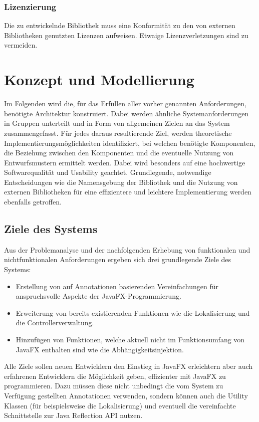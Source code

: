 \subsubsection{\nreq{} Lizenzierung}
Die zu entwickelnde Bibliothek muss eine Konformität zu den von externen Bibliotheken genutzten Lizenzen aufweisen. Etwaige Lizenzverletzungen sind zu vermeiden.

\section{Konzept und Modellierung}
\label{konzept_und_modellierung}
Im Folgenden wird die, für das Erfüllen aller vorher genannten Anforderungen, benötigte Architektur konstruiert. Dabei werden ähnliche Systemanforderungen in Gruppen unterteilt und in Form von allgemeinen Zielen an das System zusammengefasst. Für jedes daraus resultierende Ziel, werden theoretische Implementierungsmöglichkeiten identifiziert, bei welchen benötigte Komponenten, die Beziehung zwischen den Komponenten und die eventuelle Nutzung von Entwurfsmustern ermittelt werden. Dabei wird besonders auf eine hochwertige Softwarequalität und Usability geachtet. Grundlegende, notwendige Entscheidungen wie die Namensgebung der Bibliothek und die Nutzung von externen Bibliotheken für eine effizientere und leichtere Implementierung werden ebenfalls getroffen. 
\subsection{Ziele des Systems}
Aus der Problemanalyse und der nachfolgenden Erhebung von funktionalen und nichtfunktionalen Anforderungen ergeben sich drei grundlegende Ziele des Systems:
\begin{itemize}
	\item Erstellung von auf Annotationen basierenden Vereinfachungen für anspruchsvolle Aspekte der JavaFX-Programmierung.
	\item Erweiterung von bereits existierenden Funktionen wie die Lokalisierung und die Controllerverwaltung.
	\item Hinzufügen von Funktionen, welche aktuell nicht im Funktionsumfang von JavaFX enthalten sind wie die Abhängigkeitsinjektion.
\end{itemize}
Alle Ziele sollen neuen Entwicklern den Einstieg in JavaFX erleichtern aber auch erfahrenen Entwicklern die Möglichkeit geben, effizienter mit JavaFX zu programmieren. Dazu müssen diese nicht unbedingt die vom System zu Verfügung gestellten Annotationen verwenden, sondern können auch die Utility Klassen (für beispielsweise die Lokalisierung) und eventuell die vereinfachte Schnittstelle zur Java Reflection API nutzen.
